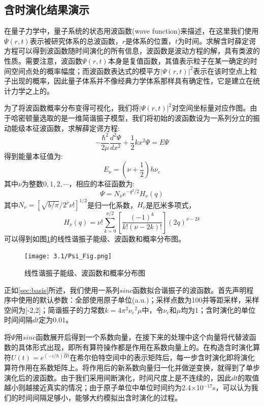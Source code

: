 
\subsection{含时演化结果演示}
在量子力学中，量子系统的状态用波函数(wave function)来描述，在这里我们使用$\Psi(r,t)$表示被研究体系的总波函数，$r$是体系的位置，$t$为时间。求解含时薛定谔方程可以得到波函数随时间演化的所有信息，波函数是波动方程的解，具有类波的性质。需要注意，波函数$\Psi(r,t)$本身是复值函数，其值表示粒子在某一确定的时间空间点处的概率幅度；而波函数表达式的模平方${|\Psi(r,t)|}^2$表示在该时空点上粒子出现的概率，因此量子体系并不像经典力学体系那样具有确定性，它是建立在统计力学之上的。

为了将波函数概率分布变得可视化，我们将${|\Psi(r,t)|}^2$对空间坐标量对应作图。由于哈密顿量选取的是一维简谐振子模型，我们将初始的波函数设为一系列分立的振动能级本征波函数，求解薛定谔方程:
\begin{equation}
  -\frac{\hbar^2}{2\mu}\frac{d^2\Psi}{dx^2} + \frac{1}{2}kx^2\Psi = E \Psi
\end{equation}
\noindent 得到能量本征值为:
\begin{equation}
  E_{\nu} = \left( \nu + \frac{1}{2}\right ) h \nu_e
\end{equation}
\noindent 其中$\nu$为整数$0,1,2,\cdots$，相应的本征函数为:
\begin{equation}
  \Psi = N_{\nu}e^{-q^2/2}H_{\nu}(q)
\end{equation}
\noindent 其中$N_{\nu} = {\left[ \sqrt{b/\pi} / 2^{\nu} \nu ! \right]}^{1/2}$是归一化系数，$H_{\nu}$是厄米多项式，
\begin{equation}
  H_{\nu}(q) = \nu ! \sum_{k=0}^{\nu / 2} \left[ \frac{{(-1)}^k}{k! {(\nu - 2k)!}} \right] {(2q)}^{\nu-2k}
\end{equation}
可以得到如图\ref{fig:Psi_Fig}的线性谐振子能级、波函数和概率分布图。
\begin{figure}[h]
  \center
  \vspace{-1mm}
  \texttt{[image: 3.1/Psi\_Fig.png]}
  \caption{线性谐振子能级、波函数和概率分布图}
  \label{fig:Psi_Fig}
\end{figure}
正如\ref{sec:basis}所述，我们使用一系列$sinc$函数拟合谐振子的波函数。首先声明程序中使用的默认参数：全部使用原子单位(a.u.)；采样点数为100并等距采样，采样空间为[-2,2]；简谐振子的力常数$k=4{\pi}^2{\nu_e}^2\mu$中，令$\nu_e$和$\mu$均为1；含时演化的单位时间间隔$dt$定为0.01。

将$\Psi$用$sinc$函数展开后得到一个系数向量，在接下来的处理中这个向量将代替波函数的具体形式出现，即所有算符操作都是作用在系数向量上的。在构造含时演化算符$U(t) = e^{(-i/\hbar)\hat{H}t}$在希尔伯特空间中的表示矩阵后，每一步含时演化即将演化算符作用在系数矩阵上。将作用后的新系数向量归一化并做逆变换，就得到了单步演化后的波函数。由于我们采用间断演化，时间尺度上是不连续的，因此$dt$的取值越小则越接近真实的情况；由于原子单位中单位时间约为2.4$\times$10$^{-17}$s，可以认为我们的时间间隔足够小，能够大约模拟出含时演化的过程。

